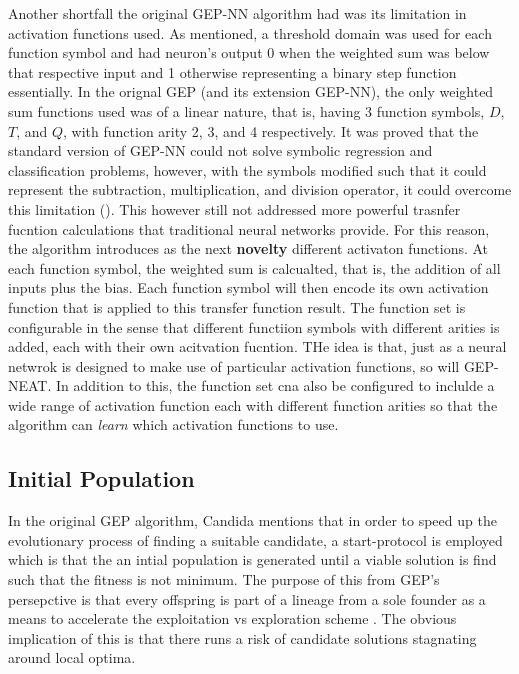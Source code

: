 \noindent Another shortfall the original GEP-NN algorithm had was its limitation in activation functions used. As mentioned, a threshold domain was used for each function symbol and had neuron's output 0 when the weighted sum was below that respective input and 1 otherwise representing a binary step function essentially. In the orignal GEP (and its extension GEP-NN), the only weighted sum functions used was of a linear nature, that is, having 3 function symbols, $D$, $T$, and $Q$, with function arity 2, 3, and 4 respectively. It was proved that the standard version of GEP-NN could not solve symbolic regression and classification problems, however, with the symbols modified such that it could represent the subtraction, multiplication, and division operator, it could overcome this limitation (\cite{improvedGepnn}). This however still not addressed more powerful trasnfer fucntion calculations that traditional neural networks provide. For this reason, the algorithm introduces as the next \textbf{novelty} different activaton functions. At each function symbol, the weighted sum is calcualted, that is,  the addition of all inputs plus the bias. Each function symbol will then encode its own activation function that is applied to this transfer function result. The function set is configurable in the sense that different functiion symbols with different arities is added, each with their own acitvation fucntion. THe idea is that, just as a neural netwrok is designed to make use of particular activation functions, so will GEP-NEAT. In addition to this, the function set cna also be configured to inclulde a wide range of activation function each with different function arities so that the algorithm can \textit{learn} which activation functions to use.


\subsection{Initial Population}
In the original GEP algorithm, Candida mentions that in order to speed up the evolutionary process of finding a suitable candidate, a start-protocol is employed which is that the an intial population is generated until a viable solution is find such that the fitness is not minimum. The purpose of this from GEP's persepctive is that every offspring is part of a lineage from a sole founder as a means to accelerate the exploitation vs exploration scheme \cite{ferreira2006gene}. The obvious implication of this is that there runs a risk of candidate solutions stagnating around local optima. \bigskip

